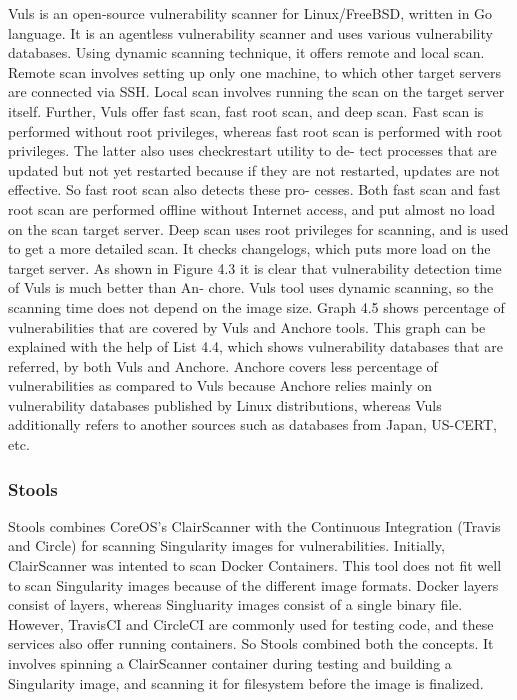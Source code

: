 \documentclass[a4paper,num-refs]{oup-contemporary}
\begin{document}
Vuls is an open-source vulnerability scanner for Linux/FreeBSD, written in Go
language. It is an agentless vulnerability scanner and uses various
vulnerability databases. Using dynamic scanning technique, it offers
remote and local scan. Remote scan involves setting up only one machine, to
which other target servers are connected via SSH. Local scan involves running
the scan on the target server itself. Further, Vuls offer fast scan, fast root scan,
and deep scan.
Fast scan is performed without root privileges, whereas fast root scan is
performed with root privileges. The latter also uses checkrestart utility to de-
tect processes that are updated but not yet restarted because if they are not
restarted, updates are not effective. So fast root scan also detects these pro-
cesses. Both fast scan and fast root scan are performed offline without Internet
access, and put almost no load on the scan target server. Deep scan uses
root privileges for scanning, and is used to get a more detailed scan. It checks
changelogs, which puts more load on the target server. As shown in Figure 4.3
it is clear that vulnerability detection time of Vuls is much better than An-
chore. Vuls tool uses dynamic scanning, so the scanning time does not depend
on the image size.
Graph 4.5 shows percentage of vulnerabilities that are
covered by Vuls and Anchore tools. This graph can be explained with the help
of List 4.4, which shows vulnerability databases that are referred, by both Vuls
and Anchore. Anchore covers less percentage of vulnerabilities as compared
to Vuls because Anchore relies mainly on vulnerability databases published by
Linux distributions, whereas Vuls additionally refers to another sources such as
databases from Japan, US-CERT, etc.

\subsubsection{Stools}

Stools combines CoreOS's ClairScanner with the Continuous Integration (Travis and
Circle) for scanning Singularity images for vulnerabilities.
Initially, ClairScanner was intented to scan Docker Containers. This tool does not fit well
to scan Singularity images because of the different image formats. Docker layers
consist of layers, whereas Singluarity images consist of a single binary file.
However, TravisCI and CircleCI are commonly used for testing code, and these
services also offer running containers. So Stools combined both the concepts.
It involves spinning a ClairScanner container during testing and building a
Singularity image, and scanning it for filesystem before the image is finalized.
\end{document}
